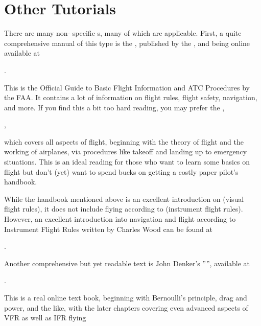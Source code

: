 \section{Other Tutorials}

There are many non-\FlightGear{} specific s, many of which are applicable. First, a quite
comprehensive manual of this type is the , published by the , and being online
available at

\medskip
{}.
\medskip
\noindent

This is the Official Guide to Basic Flight Information and ATC Procedures by the FAA. It
contains a lot of information on flight rules, flight safety, navigation, and more. If
you find this a bit too hard reading, you may prefer the ,

\medskip
{},
\medskip
\noindent

which covers all aspects of flight, beginning with the theory of flight and the working
of airplanes, via procedures like takeoff and landing up to emergency situations. This is
an ideal reading for those who want to learn some basics on flight but don't (yet) want
to spend bucks on getting a costly paper pilot's handbook.

While the handbook mentioned above is an excellent introduction on  (visual
flight rules), it does not include flying according to  (instrument flight
rules). However, an excellent introduction into navigation and flight according to
Instrument Flight Rules written by Charles Wood can be found at

.

Another comprehensive but yet readable text is John Denker's
'''', available at
\medskip

.
\medskip

 \noindent
This is a real online text book, beginning with Bernoulli's principle, drag and power,
and the like, with the later chapters covering even advanced aspects of VFR as well as
IFR flying


